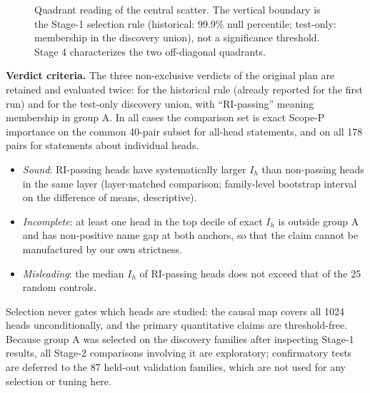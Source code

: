 \begin{figure}[ht]
\centering
{}
\caption{Quadrant reading of the central scatter. The vertical boundary is the Stage-1 selection rule (historical: 99.9\% null percentile; test-only: membership in the discovery union), not a significance threshold. Stage 4 characterizes the two off-diagonal quadrants.}
\end{figure}

\textbf{Verdict criteria.} The three non-exclusive verdicts of the original plan are retained and evaluated twice: for the historical rule (already reported for the first run) and for the test-only discovery union, with ``RI-passing'' meaning membership in group A. In all cases the comparison set is exact Scope-P importance on the common 40-pair subset for all-head statements, and on all 178 pairs for statements about individual heads.
\begin{itemize}[itemsep=1pt]
\item \emph{Sound}: RI-passing heads have systematically larger $I_h$ than non-passing heads in the same layer (layer-matched comparison; family-level bootstrap interval on the difference of means, descriptive).
\item \emph{Incomplete}: at least one head in the top decile of exact $I_h$ is outside group A and has non-positive name gap at both anchors, so that the claim cannot be manufactured by our own strictness.
\item \emph{Misleading}: the median $I_h$ of RI-passing heads does not exceed that of the 25 random controls.
\end{itemize}
Selection never gates which heads are studied: the causal map covers all 1024 heads unconditionally, and the primary quantitative claims are threshold-free. Because group A was selected on the discovery families after inspecting Stage-1 results, all Stage-2 comparisons involving it are exploratory; confirmatory tests are deferred to the 87 held-out validation families, which are not used for any selection or tuning here.

